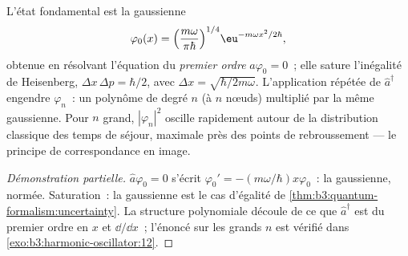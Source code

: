\begin{proposition}\label{prop:b3:harmonic-oscillator:wavefunctions}
L'état fondamental est la gaussienne
\[
\varphi_0(x) = \Big(\frac{m\omega}{\pi\hbar}\Big)^{1/4}
\eu^{-m\omega x^2/2\hbar} ,
\]
obtenue en résolvant l'équation du \emph{premier ordre} $\hat a\varphi_0
= 0$~; elle sature l'inégalité de Heisenberg, $\Delta x\,\Delta p =
\hbar/2$, avec $\Delta x = \sqrt{\hbar/2m\omega}$. L'application
répétée de $\hat a^\dagger$ engendre $\varphi_n$~: un polynôme de degré
$n$ (à $n$ nœuds) multiplié par la même gaussienne. Pour $n$ grand,
$|\varphi_n|^2$ oscille rapidement autour de la distribution classique
des temps de séjour, maximale près des points de rebroussement --- le
principe de correspondance en image.
\end{proposition}

\begin{proof}[Démonstration partielle]
$\hat a\varphi_0 = 0$ s'écrit $\varphi_0' = -(m\omega/\hbar)x
\varphi_0$~: la gaussienne, normée. Saturation~: la gaussienne est le
cas d'égalité de \cref{thm:b3:quantum-formalism:uncertainty}. La
structure polynomiale découle de ce que $\hat a^\dagger$ est du premier
ordre en $x$ et $\dd/\dd x$~; l'énoncé sur les grands $n$ est vérifié
dans \cref{exo:b3:harmonic-oscillator:12}.
\end{proof}

